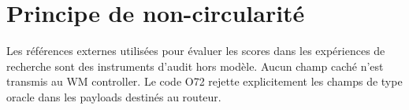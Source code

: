 \documentclass[11pt,a4paper]{article}
\begin{document}
\section{Principe de non-circularité}
Les références externes utilisées pour évaluer les scores dans les expériences de recherche sont des instruments d'audit hors modèle. Aucun champ caché n'est transmis au WM controller. Le code O72 rejette explicitement les champs de type oracle dans les payloads destinés au routeur.
\end{document}
